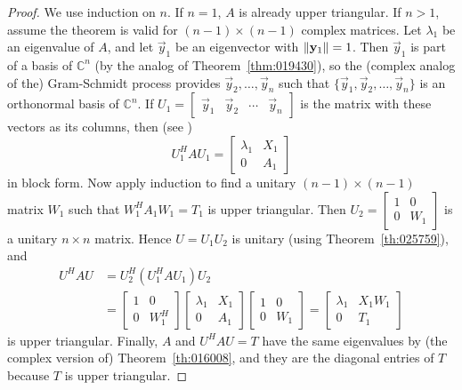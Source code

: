 \documentclass{ximera}
\begin{document}
\begin{proof}
We use induction on $n$. If $n = 1$, $A$ is already upper triangular. If $n > 1$, assume the theorem is valid for $(n - 1) \times (n - 1)$ complex matrices. Let $\lambda_{1}$ be an eigenvalue of $A$, and let $\vec{y}_{1}$ be an eigenvector with $\left\lVert\mathbf{y}_{1}\right\rVert = 1$. Then $\vec{y}_{1}$ is part of a basis of $\mathbb{C}^n$ (by the analog of Theorem~\ref{thm:019430}), so the (complex analog of the) Gram-Schmidt process provides $\vec{y}_{2}, \ldots, \vec{y}_{n}$ such that $\{\vec{y}_{1}, \vec{y}_{2}, \ldots, \vec{y}_{n}\}$ is an orthonormal basis of $\mathbb{C}^n$. If $U_{1} = \left[ \begin{array}{cccc}
\vec{y}_{1} & \vec{y}_{2} & \cdots & \vec{y}_{n}
\end{array}\right]$ is the matrix with these vectors as its columns, then (see )
\begin{equation*}
U_{1}^HAU_{1} = \left[ \begin{array}{cc}
\lambda_{1} & X_{1} \\
0 & A_{1}
\end{array}\right]
\end{equation*}
in block form. Now apply induction to find a unitary $(n - 1) \times (n - 1)$ matrix $W_{1}$ such that $W_{1}^HA_{1}W_{1} = T_{1}$
 is upper triangular. Then $U_{2} = \left[ \begin{array}{cc}
 1 & 0 \\
 0 & W_{1}
 \end{array}\right]$
 is a unitary $n \times n$ matrix. Hence $U = U_{1}U_{2}$ is unitary (using Theorem~\ref{th:025759}), and
\begin{align*}
U^HAU &= U_{2}^H(U_{1}^HAU_{1})U_{2} \\
	   &= \left[ \begin{array}{cc}
	   1 & 0 \\
	   0 & W_{1}^H
	   \end{array}\right] \left[ \begin{array}{cc}
   	   \lambda_{1} & X_{1} \\
	   0 & A_{1}
	   \end{array}\right] \left[ \begin{array}{cc}
	   1 & 0 \\
	   0 & W_{1}
	   \end{array}\right] = \left[ \begin{array}{cc}
	   \lambda_{1} & X_{1}W_{1} \\
	   0 & T_{1}
	   \end{array}\right]
\end{align*}
is upper triangular. Finally, $A$ and $U^{H}AU = T$ have the same eigenvalues by (the complex version of) Theorem~\ref{th:016008}, and they are the diagonal entries of $T$ because $T$ is upper triangular.
\end{proof}
\end{document}
